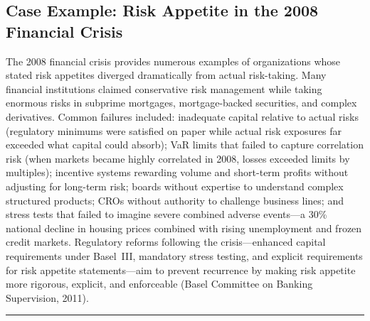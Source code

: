 \documentclass[11pt,openany]{book}
\begin{document}
\subsection{Case Example: Risk Appetite in the 2008 Financial Crisis}
\label{subsec:financial-crisis}

The 2008 financial crisis provides numerous examples of organizations whose
stated risk appetites diverged dramatically from actual risk-taking. Many
financial institutions claimed conservative risk management while taking enormous
risks in subprime mortgages, mortgage-backed securities, and complex derivatives.
Common failures included: inadequate capital relative to actual risks (regulatory
minimums were satisfied on paper while actual risk exposures far exceeded what
capital could absorb); VaR limits that failed to capture correlation risk (when
markets became highly correlated in 2008, losses exceeded limits by multiples);
incentive systems rewarding volume and short-term profits without adjusting for
long-term risk; boards without expertise to understand complex structured
products; CROs without authority to challenge business lines; and stress tests
that failed to imagine severe combined adverse events---a 30\% national decline
in housing prices combined with rising unemployment and frozen credit markets.
Regulatory reforms following the crisis---enhanced capital requirements under
Basel~III, mandatory stress testing, and explicit requirements for risk appetite
statements---aim to prevent recurrence by making risk appetite more rigorous,
explicit, and enforceable (Basel Committee on Banking Supervision, 2011).

\begin{center}\rule{0.5\linewidth}{0.5pt}\end{center}
\end{document}
